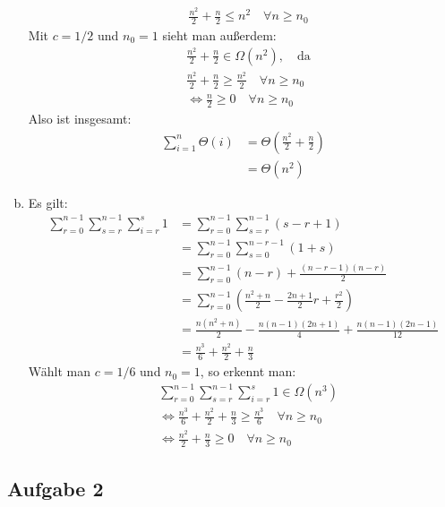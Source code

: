\documentclass[11pt]{article}
\begin{document}
\begin{enumerate}[a)]
\begin{align*}
      \\ &\frac{n^2}{2} + \frac{n}{2} \leq n^2 \quad\forall n \geq n_0
    \end{align*}
    Mit $c = 1/2$ und $n_0 = 1$ sieht man außerdem:
    \begin{align*}
      &\frac{n^2}{2} + \frac{n}{2} \in \Omega (n^2),\quad\text{da}
      \\ &\frac{n^2}{2} + \frac{n}{2} \geq\frac{n^2}{2}\quad\forall n\geq n_0
      \\ &\Leftrightarrow \frac{n}{2} \geq 0 \quad\forall n \geq n_0
    \end{align*}
    Also ist insgesamt:
    \begin{align*}
      \sum_{i=1}^n \Theta (i) &= \Theta \left(\frac{n^2}{2}+\frac{n}{2}\right)
      \\ &= \Theta (n^2)
    \end{align*}
  \item Es gilt:
    \begin{align*}
      \sum_{r=0}^{n-1} \sum_{s=r}^{n-1} \sum_{i=r}^{s} 1 &= \sum_{r=0}^{n-1}
        \sum_{s=r}^{n-1} (s-r+1)
      \\ &= \sum_{r=0}^{n-1} \sum_{s=0}^{n-r-1} (1+s)
      \\ &= \sum_{r=0}^{n-1} (n-r) + \frac{(n-r-1)(n-r)}{2}
      \\ &= \sum_{r=0}^{n-1} \left(\frac{n^2+n}{2}-\frac{2n+1}{2}r+
        \frac{r^2}{2}\right)
      \\ &= \frac{n(n^2+n)}{2}-\frac{n(n-1)(2n+1)}{4}+\frac{n(n-1)(2n-1)}{12}
      \\ &= \frac{n^3}{6} + \frac{n^2}{2} + \frac{n}{3}
    \end{align*}
     Wählt man $c = 1/6$ und $n_0 = 1$, so erkennt man:
     \begin{align*}
       &\sum_{r=0}^{n-1} \sum_{s=r}^{n-1} \sum_{i=r}^{s} 1 \in \Omega (n^3)
       \\ &\Leftrightarrow \frac{n^3}{6} + \frac{n^2}{2} + \frac{n}{3} \geq
         \frac{n^3}{6} \quad\forall n \geq n_0
       \\&\Leftrightarrow\frac{n^2}{2}+\frac{n}{3}\geq 0\quad\forall n\geq n_0
     \end{align*}
\end{enumerate}
\subsection*{Aufgabe 2}
%
\end{document}
